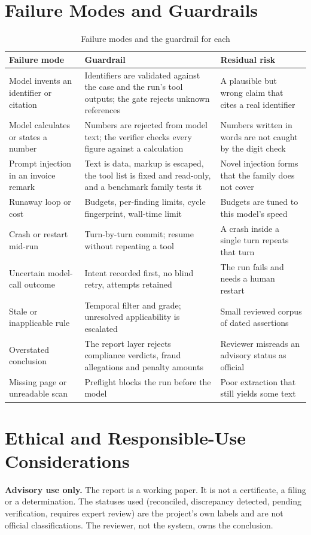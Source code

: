 \section{Failure Modes and Guardrails}
\begin{table}[H]
\centering
\caption{Failure modes and the guardrail for each}
\label{tab:failures}
\small
\begin{tabularx}{\linewidth}{@{}p{3.6cm} X X@{}}
\toprule
\textbf{Failure mode} & \textbf{Guardrail} & \textbf{Residual risk} \\ \midrule
Model invents an identifier or citation & Identifiers are validated against the case and the run's tool outputs; the gate rejects unknown references & A plausible but wrong claim that cites a real identifier \\
Model calculates or states a number & Numbers are rejected from model text; the verifier checks every figure against a calculation & Numbers written in words are not caught by the digit check \\
Prompt injection in an invoice remark & Text is data, markup is escaped, the tool list is fixed and read-only, and a benchmark family tests it & Novel injection forms that the family does not cover \\
Runaway loop or cost & Budgets, per-finding limits, cycle fingerprint, wall-time limit & Budgets are tuned to this model's speed \\
Crash or restart mid-run & Turn-by-turn commit; resume without repeating a tool & A crash inside a single turn repeats that turn \\
Uncertain model-call outcome & Intent recorded first, no blind retry, attempts retained & The run fails and needs a human restart \\
Stale or inapplicable rule & Temporal filter and grade; unresolved applicability is escalated & Small reviewed corpus of dated assertions \\
Overstated conclusion & The report layer rejects compliance verdicts, fraud allegations and penalty amounts & Reviewer misreads an advisory status as official \\
Missing page or unreadable scan & Preflight blocks the run before the model & Poor extraction that still yields some text \\
\bottomrule
\end{tabularx}
\end{table}

\section{Ethical and Responsible-Use Considerations}
\textbf{Advisory use only.} The report is a working paper. It is not a certificate, a filing or a determination.
The statuses used (reconciled, discrepancy detected, pending verification, requires expert review) are
the project's own labels and are not official classifications. The reviewer, not the system, owns the
conclusion.

